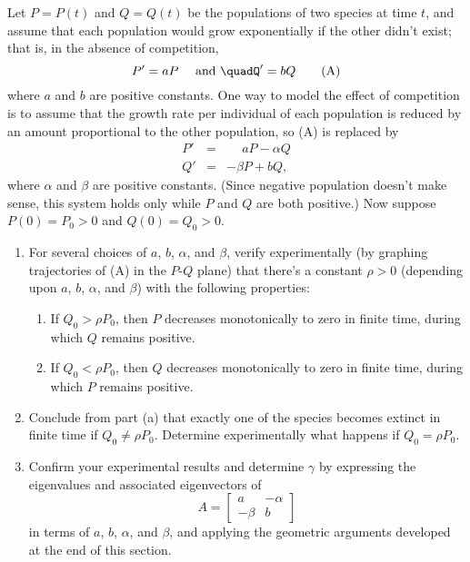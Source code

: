 \documentclass{ximera}
\begin{document}
\begin{problem}\label{exer:10.4.42} 
Let $P=P(t)$ and $Q=Q(t)$ be the populations of two species at time
$t$, and assume that each population would grow exponentially if the
other didn't exist; that is, in the absence of competition,
$$
P'=aP \quad\text{ and }\quadQ'=bQ
\quad\quad \text{(A)}
$$
where $a$ and $b$ are positive constants. One way to model the effect
of competition is to assume that the growth rate per individual of
each population is reduced by an amount proportional to the other
population, so (A) is replaced by
\begin{eqnarray*}
P'&=&\phantom{-}aP-\alpha Q\\
Q'&=&-\beta P+bQ,
\end{eqnarray*}
where $\alpha$ and $\beta$ are positive constants. (Since negative
population doesn't make sense, this system holds only while $P$ and
$Q$ are both positive.) Now suppose $P(0)=P_0>0$ and
$Q(0)=Q_0>0$.

\begin{enumerate}
\item %
For several choices of $a$, $b$, $\alpha$, and $\beta$, verify
experimentally
(by graphing trajectories of (A) in the $P$-$Q$ plane) that there's a
constant $\rho>0$ (depending upon $a$, $b$, $\alpha$, and $\beta$) with the
following properties:
\begin{enumerate}
\item %
If $Q_0>\rho P_0$, then $P$ decreases monotonically to zero
in finite time, during which $Q$ remains positive.
\item %
If $Q_0<\rho P_0$, then $Q$ decreases monotonically to zero in
finite time, during which $P$ remains positive.
\end{enumerate}
\item %
Conclude from  part (a) that exactly one of the species
becomes extinct in finite time if $Q_0\ne\rho P_0$. Determine
experimentally what happens if $Q_0=\rho P_0$.
\item %
Confirm your experimental results and determine $\gamma$ by expressing
the eigenvalues and associated eigenvectors of
$$
A=\begin{bmatrix} a &-\alpha\\-\beta&b\end{bmatrix}
$$
in terms of $a$, $b$, $\alpha$, and $\beta$, and applying the geometric
arguments developed at the end of this section.
\end{enumerate}


\end{problem}
\end{document}
